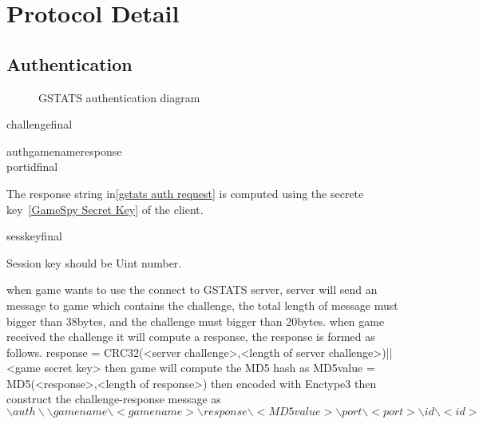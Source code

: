 \documentclass[oneside,titlepage,a4paper]{Definition/retrospy} %
\begin{document}
\chapter{Protocol Detail}
\section{Authentication}\label{gstats authentication}


\begin{figure}[H]
	\centering
	\caption{GSTATS authentication diagram}
	\label{GSTATS authentication diagram}
\end{figure}

\ServerChallenge

\begin{mybox}
	\tbs challenge\tbs<challenge string>\tbs final\tbs
\end{mybox}


\ClientRequest

\begin{mybox}[label = gstats auth request]
	\tbs auth\tbs\tbs gamename\tbs<game name>\tbs response\tbs<response string>\\
	\tbs port\tbs<game port>\tbs id\tbs<operation id>\tbs final\tbs
\end{mybox}
The response string in\ref {gstats auth request} is computed using the secrete key~\ref{GameSpy Secret Key} of the client.\\

\ServerResponse

\begin{mybox}
	\tbs sesskey\tbs<session key>\tbs final\tbs
\end{mybox}

Session key should be Uint number.

when game wants to use the connect to GSTATS server, server will send an message to game which contains the challenge, the total length of message must bigger than 38bytes, and the challenge must bigger than 20bytes.
when game received the challenge it will compute a response, the response is formed as follows. 
response = CRC32(<server challenge>,<length of server challenge>)||<game secret key>
then game will compute the MD5 hash as MD5value = MD5(<response>,<length of response>)
then encoded with Enctype3
then construct the challenge-response message as $ \backslash auth \backslash \backslash gamename \backslash <gamename>\backslash response \backslash <MD5value> \backslash port \backslash <port> \backslash id \backslash <id> $
\end{document}
